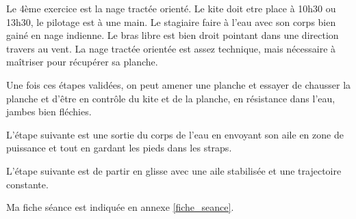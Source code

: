 \documentclass[11pt,a4paper]{report}
\begin{document}
Le 4ème exercice est la nage tractée orienté.
Le kite doit etre place à 10h30 ou 13h30, le pilotage
est à une main. Le stagiaire faire  à l'eau
avec son corps bien gainé en nage indienne. Le bras
libre est bien droit pointant dans une direction 
travers au vent. La nage tractée orientée est assez
technique, mais nécessaire à maîtriser pour récupérer 
sa planche.

Une fois ces étapes validées, on peut
amener une planche et essayer de chausser la planche
et d’être en contrôle du kite et de la planche, 
en résistance dans l'eau, jambes bien fléchies.

L'étape suivante est une sortie du corps de l'eau
en envoyant son aile en zone de puissance et tout en 
gardant les pieds dans les straps. 

L'étape suivante est de partir en glisse avec
une aile stabilisée et une trajectoire constante.

Ma fiche séance est indiquée en annexe \ref{fiche_seance}.
\end{document}
